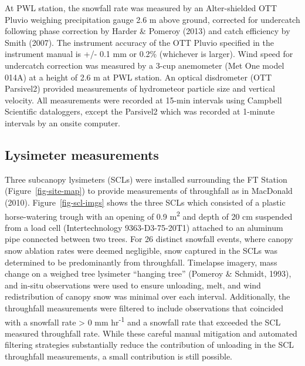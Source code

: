\documentclass[
  letterpaper,
  DIV=11,
  numbers=noendperiod]{scrartcl}
\begin{document}
At PWL station, the snowfall rate was measured by an Alter-shielded OTT
Pluvio weighing precipitation gauge 2.6 m above ground, corrected for
undercatch following phase correction by Harder \& Pomeroy (2013) and
catch efficiency by Smith (2007). The instrument accuracy of the OTT
Pluvio specified in the instrument manual is +/- 0.1 mm or 0.2\%
(whichever is larger). Wind speed for undercatch correction was measured
by a 3-cup anemometer (Met One model 014A) at a height of 2.6 m at PWL
station. An optical disdrometer (OTT Parsivel2) provided measurements of
hydrometeor particle size and vertical velocity. All measurements were
recorded at 15-min intervals using Campbell Scientific dataloggers,
except the Parsivel2 which was recorded at 1-minute intervals by an
onsite computer.

\subsection{Lysimeter measurements}\label{lysimeter-measurements}

Three subcanopy lysimeters (SCLs) were installed surrounding the FT
Station (Figure~\ref{fig-site-map}) to provide measurements of
throughfall as in MacDonald (2010). Figure~\ref{fig-scl-imgs} shows the
three SCLs which consisted of a plastic horse-watering trough with an
opening of 0.9 m\textsuperscript{2} and depth of 20 cm suspended from a
load cell (Intertechnology 9363-D3-75-20T1) attached to an aluminum pipe
connected between two trees. For 26 distinct snowfall events, where
canopy snow ablation rates were deemed negligible, snow captured in the
SCLs was determined to be predominantly from throughfall. Timelapse
imagery, mass change on a weighed tree lysimeter ``hanging tree''
(Pomeroy \& Schmidt, 1993), and in-situ observations were used to ensure
unloading, melt, and wind redistribution of canopy snow was minimal over
each interval. Additionally, the throughfall measurements were filtered
to include observations that coincided with a snowfall rate
\textgreater{} 0 mm hr\textsuperscript{-1} and a snowfall rate that
exceeded the SCL measured throughfall rate. While these careful manual
mitigation and automated filtering strategies substantially reduce the
contribution of unloading in the SCL throughfall measurements, a small
contribution is still possible.
\end{document}
